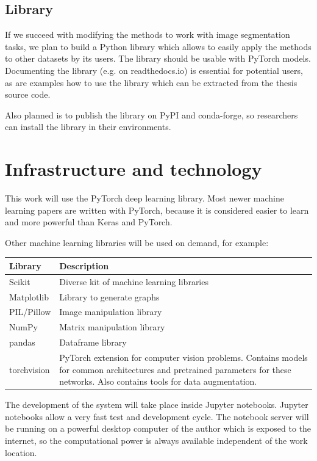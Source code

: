 \subsection{Library}
If we succeed with modifying the methods to work with image segmentation tasks, we plan to build a Python library which allows to easily apply the methods to other datasets by its users. The library should be usable with PyTorch models. Documenting the library (e.g. on readthedocs.io) is essential for potential users, as are examples how to use the library which can be extracted from the thesis source code.

Also planned is to publish the library on PyPI and conda-forge, so researchers can install the library in their environments.

\section{Infrastructure and technology}
This work will use the PyTorch\cite{paszke2017automatic} deep learning library. Most newer machine learning papers are written with PyTorch, because it is considered easier to learn and more powerful than Keras and PyTorch\cite{pytorchvstensorflow}.

Other machine learning libraries will be used on demand, for example:

\begin{tabular}{|p{3cm}|p{12.5cm}|}
    \hline
    \textbf{Library} & \textbf{Description} \\ \hline
    Scikit & Diverse kit of machine learning libraries \\ \hline
    Matplotlib & Library to generate graphs \\ \hline
    PIL/Pillow & Image manipulation library \\ \hline
    NumPy & Matrix manipulation library \\ \hline
    pandas & Dataframe library \\ \hline
    torchvision & PyTorch extension for computer vision problems. Contains models for common architectures and pretrained parameters for these networks. Also contains tools for data augmentation. \\ \hline
\end{tabular}

The development of the system will take place inside Jupyter notebooks. Jupyter notebooks allow a very fast test and development cycle. The notebook server will be running on a powerful desktop computer of the author which is exposed to the internet, so the computational power is always available independent of the work location.

